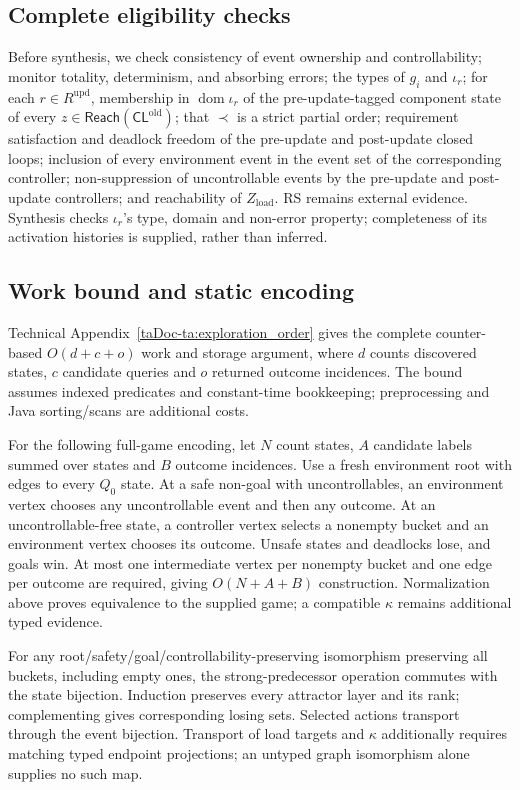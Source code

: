 \documentclass[11pt]{article}
\newcommand{\Reach}{\mathsf{Reach}}
\begin{document}
\subsection{Complete eligibility checks}
Before synthesis, we check
consistency of event ownership and controllability;
monitor totality, determinism, and absorbing errors; the types of $g_i$ and $\iota_r$; for each $r\in R^{\mathrm{upd}}$, membership in $\operatorname{dom}\iota_r$ of the pre-update-tagged component state of every $z\in\Reach(\mathsf{CL}^{\mathrm{old}})$;
that $\prec$ is a strict partial order; requirement satisfaction and deadlock freedom of the pre-update and post-update closed loops; inclusion of every environment event in the event set of the corresponding controller;
non-suppression of uncontrollable events by the pre-update and post-update controllers; and
reachability of $Z_{\mathrm{load}}$. RS remains external evidence. Synthesis checks $\iota_r$'s type, domain and non-error property; completeness of its activation histories is supplied, rather than inferred.

\subsection{Work bound and static encoding}
Technical Appendix~\ref{taDoc-ta:exploration_order} gives the complete counter-based $O(d+c+o)$ work and storage argument, where $d$ counts discovered states, $c$ candidate queries and $o$ returned outcome incidences. The bound assumes indexed predicates and constant-time bookkeeping; preprocessing and Java sorting/scans are additional costs.

For the following full-game encoding, let $N$ count states, $A$ candidate labels summed over states and $B$ outcome incidences. Use a fresh environment root with edges to every $Q_0$ state. At a safe non-goal with uncontrollables, an environment vertex chooses any uncontrollable event and then any outcome. At an uncontrollable-free state, a controller vertex selects a nonempty bucket and an environment vertex chooses its outcome. Unsafe states and deadlocks lose, and goals win. At most one intermediate vertex per nonempty bucket and one edge per outcome are required, giving $O(N+A+B)$ construction. Normalization above proves equivalence to the supplied game; a compatible $\kappa$ remains additional typed evidence.

For any root/safety/goal/controllability-preserving isomorphism preserving all buckets, including empty ones, the strong-predecessor operation commutes with the state bijection. Induction preserves every attractor layer and its rank; complementing gives corresponding losing sets. Selected actions transport through the event bijection. Transport of load targets and $\kappa$ additionally requires matching typed endpoint projections; an untyped graph isomorphism alone supplies no such map.
\end{document}
